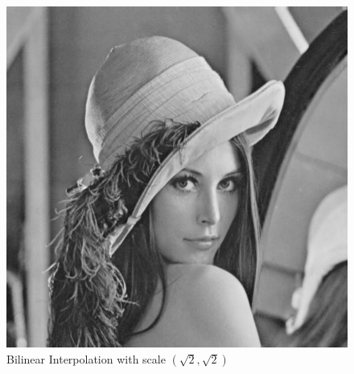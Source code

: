 \begin{figure}[H]
    \centering
    \includegraphics[scale=0.5]{images/lenna-bilinear.jpg}
    \caption{Bilinear Interpolation with scale $(\sqrt{2}, \sqrt{2})$}
    \label{fig:lenna-bilinear}
\end{figure}